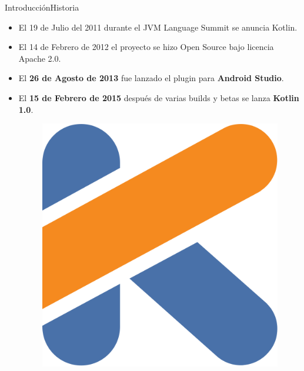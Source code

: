 \begin{frame}{Introducción}{Historia}
 \begin{itemize}
  \item El 19 de Julio del 2011 durante el JVM Language Summit se anuncia Kotlin.
  \item El 14 de Febrero de 2012 el proyecto se hizo Open Source bajo licencia Apache 2.0.
  \item<1-> El \textbf{26 de Agosto de 2013} fue lanzado el plugin para \textbf{Android Studio}.
  \item<2-> El \textbf{15 de Febrero de 2015} después de varias builds y betas se lanza \textbf{Kotlin 1.0}.
  \begin{figure}[!htb]
     \endminipage
     \includegraphics[width=\linewidth]{images/introduction/kotlin_logo_1}
     \endminipage
     \endminipage
    \end{figure}
\end{itemize}
\end{frame}
